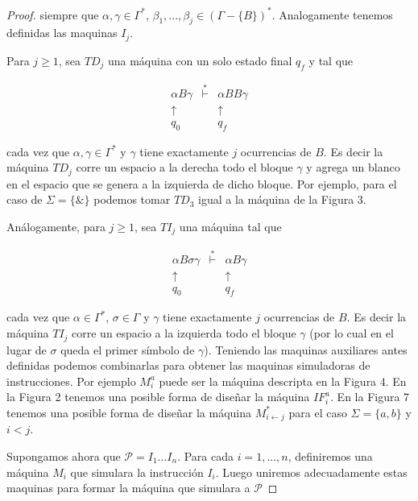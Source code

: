 \begin{proof}
		\bigskip

    \noindent siempre que $\alpha ,\gamma \in \Gamma ^{\ast }$, $\beta _{1},...,\beta _{j}\in (\Gamma -\{B\})^{\ast }$.
    Analogamente tenemos definidas las maquinas $I_{j}.$

    Para $j\geq 1$, sea $TD_{j}$ una máquina con un solo estado final $q_{f}$ y tal que

		\[
    \displaystyle \begin{array}{ccc} \alpha B\gamma & \overset{\ast }{\vdash } & \alpha BB\gamma \\
    \uparrow & & \uparrow \ \ \\ q_{0} & & q_{f}\ \ \end{array}
    \]

		\bigskip

    cada vez que $\alpha ,\gamma \in \Gamma ^{\ast }$ y $\gamma $ tiene exactamente $j$ ocurrencias de $B$.
    Es decir la máquina $TD_{j}$ corre un espacio a la derecha todo el bloque $\gamma $ y agrega un blanco en el espacio
    que se genera a la izquierda de dicho bloque. Por ejemplo, para el caso de $\Sigma =\{\& \}$ podemos tomar $TD_{3}$
    igual a la máquina de la Figura 3.

    Análogamente, para $j\geq 1$, sea $TI_{j}$ una máquina tal que

		\[
	  \displaystyle \begin{array}{ccc} \alpha B\sigma \gamma & \overset{\ast }{\vdash } & \alpha B\gamma \\
    \uparrow \ & & \uparrow \\ q_{0}\ \ & & q_{f} \end{array}
	  \]

    cada vez que $\alpha \in \Gamma ^{\ast }$, $\sigma \in \Gamma $ y $\gamma $ tiene exactamente $j$ ocurrencias de
    $B$. Es decir la máquina $TI_{j}$ corre un espacio a la izquierda todo el bloque $\gamma $ (por lo cual en el lugar
    de $\sigma $ queda el primer símbolo de $\gamma $).
    Teniendo las maquinas auxiliares antes definidas podemos combinarlas para obtener las maquinas simuladoras de
    instrucciones. Por ejemplo $M_{i}^{a}$ puede ser la máquina descripta en la Figura 4. En la Figura 2 tenemos una
    posible forma de diseñar la máquina $IF_{i}^{a}$. En la Figura 7 tenemos una posible forma de diseñar la máquina
    $M_{i\leftarrow j}^{\ast }$ para el caso $\Sigma =\{a,b\}$ y $i< j$.

    Supongamos ahora que $\mathcal{P}=I_{1}...I_{n}$. Para cada $i=1,...,n$, definiremos una máquina $M_{i}$ que
    simulara la instrucción $I_{i}$. Luego uniremos adecuadamente estas maquinas para formar la máquina que simulara a
    $ \mathcal{P}$


\end{proof}
